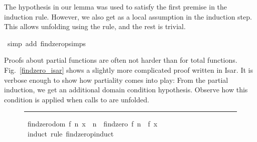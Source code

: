 \begin{isabellebody}
\begin{isamarkuptxt}
  \noindent The hypothesis in our lemma was used to satisfy the first premise in
  the induction rule. However, we also get  as a local assumption in the induction step. This
  allows unfolding  using the 
  rule, and the rest is trivial.%
\end{isamarkuptxt}%
\isamarkuptrue%
\isamarkupfalse%
\ {}simp\ add{}\ findzero{}psimps{}\isanewline
{}\isamarkupfalse%
%
\endisatagproof
{\isafoldproof}%
%
\isadelimproof
%
\endisadelimproof
%
\begin{isamarkuptext}%
Proofs about partial functions are often not harder than for total
  functions. Fig.~\ref{findzero_isar} shows a slightly more
  complicated proof written in Isar. It is verbose enough to show how
  partiality comes into play: From the partial induction, we get an
  additional domain condition hypothesis. Observe how this condition
  is applied when calls to  are unfolded.%
\end{isamarkuptext}%
\isamarkuptrue%
%
\begin{figure}
\hrule\vspace{6pt}
\begin{minipage}{0.8\textwidth}
\isastyle\isamarkuptrue
{}\isamarkupfalse%
\ {}{}findzero{}dom\ {}f{}\ n{}{}\ x\ {}\ {}n\ {}{}{}\ findzero\ f\ n{}{}\ {}\ f\ x\ {}\ {}{}\isanewline
%
\isadelimproof
%
\endisadelimproof
%
\isatagproof
{}\isamarkupfalse%
\ {}induct\ rule{}\ findzero{}pinduct{}\isanewline

\end{minipage}
\end{figure}
\end{isabellebody}
